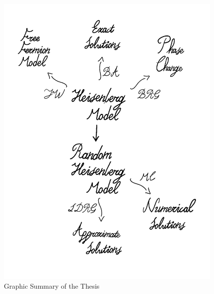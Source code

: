 \documentclass[../main.tex]{subfiles}
\begin{document}
\setcounter{page}{3}

\tableofcontents
\newpage

\thispagestyle{empty}
\begin{figure}[h!]
    \centering
    \caption*{\Huge{Graphic Summary of the Thesis}}
    \includegraphics[scale=0.4]{Misc/Diagram.png}
\end{figure}

\newpage
{}
\setcounter{page}{0}
\end{document}
